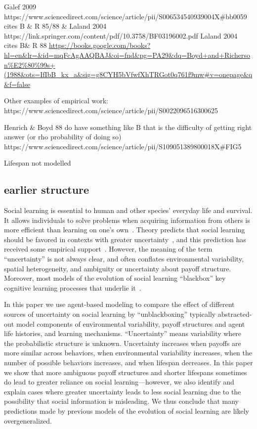 \documentclass[letterpaper,11.5pt]{scrartcl}
\begin{document}
{Galef 2009} https://www.sciencedirect.com/science/article/pii/S006534540939004X\#bb0059
cites {B \& R 85/88 \& Laland 2004} https://link.springer.com/content/pdf/10.3758/BF03196002.pdf
Laland 2004 cites {B\& R 88}
\url{https://books.google.com/books?hl=en&lr=&id=mqFcAgAAQBAJ&oi=fnd&pg=PA29&dq=Boyd+and+Richerson\%E2\%80\%99s+(1988&ots=IfIbB_kx_a&sig=g8CYH5bVfwfXhTRGot0q761f9mw\#v=onepage&q&f=false}


Other examples of empirical work: https://www.sciencedirect.com/science/article/pii/S0022096516300625

Henrich \& Boyd 88 do have something like B that is the difficulty of getting right answer (or rho probability of doing so)
https://www.sciencedirect.com/science/article/pii/S109051389800018X\#FIG5

Lifespan not modelled 

\subsection{earlier structure}


Social learning is essential to human and other species' everyday life and survival.
It allows individuals to solve problems when acquiring information from others is more efficient than learning
on one's own~\cite{Laland2004}. Theory predicts that social
learning should be favored in contexts with greater
uncertainty~\cite{BoydRicherson1985,Henrich1998}, and this prediction has received some empirical support~\cite{McElreath2005,Kendal2018}. 
However, the meaning of the term ``uncertainty'' is not always clear, and often conflates environmental variability, spatial heterogeneity, and ambiguity or uncertainty about payoff structure. 
Moreover, most models of the evolution of social learning ``blackbox'' key 
cognitive learning processes that underlie it~\cite{Heyes2016}. 

In this paper we use agent-based modeling to compare the effect of
different sources of uncertainty on social learning
by ``unblackboxing'' typically abstracted-out model components 
of environmental variability, payoff structures and
agent life histories, and  learning mechanisms. ``Uncertainty''  
means variability where the probabilistic structure is unknown. %
Uncertainty increases when payoffs are more similar across behaviors, when
environmental variability increases, when the number of possible behaviors
increases, and when lifespan decreases.  In this paper we show that more ambiguous
payoff structures and shorter lifespans sometimes do lead to greater reliance on
social learning---however, we also identify and explain cases where greater
uncertainty leads to less social learning due to the possibility that social
information is misleading.  We thus conclude that many predictions made by previous
models of the evolution of social learning are likely overgeneralized.
\end{document}
